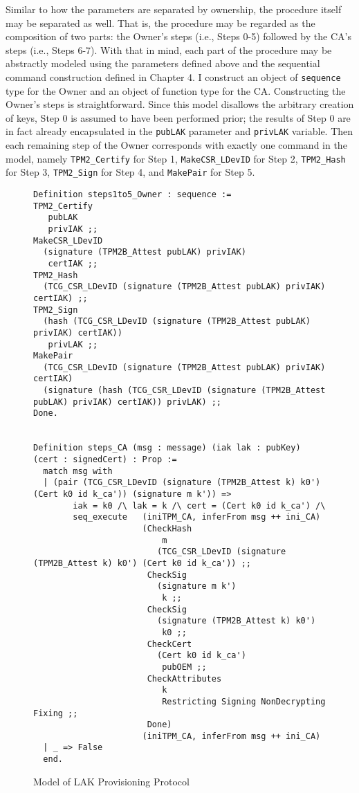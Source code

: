  Similar to how the parameters are separated by ownership, the procedure itself may be separated as well. That is, the procedure may be regarded as the composition of two parts: the Owner's steps (i.e., Steps 0-5) followed by the CA's steps (i.e., Steps 6-7).
 With that in mind, each part of the procedure may be abstractly modeled using the parameters defined above and the sequential command construction defined in Chapter 4. I construct an object of \verb|sequence| type for the Owner and an object of function type for the CA. Constructing the Owner's steps is straightforward. Since this model disallows the arbitrary creation of keys, Step 0 is assumed to have been performed prior; the results of Step 0 are in fact already encapsulated in the \verb|pubLAK| parameter and \verb|privLAK| variable. Then each remaining step of the Owner corresponds with exactly one command in the model, namely \verb|TPM2_Certify| for Step 1, \verb|MakeCSR_LDevID| for Step 2, \verb|TPM2_Hash| for Step 3, \verb|TPM2_Sign| for Step 4, and \verb|MakePair| for Step 5. 
\begin{figure}[h!]
\begin{lstlisting}[language=Coq]
Definition steps1to5_Owner : sequence :=
TPM2_Certify 
   pubLAK 
   privIAK ;;
MakeCSR_LDevID 
  (signature (TPM2B_Attest pubLAK) privIAK) 
   certIAK ;;
TPM2_Hash 
  (TCG_CSR_LDevID (signature (TPM2B_Attest pubLAK) privIAK) certIAK) ;;
TPM2_Sign 
  (hash (TCG_CSR_LDevID (signature (TPM2B_Attest pubLAK) privIAK) certIAK)) 
   privLAK ;;
MakePair 
  (TCG_CSR_LDevID (signature (TPM2B_Attest pubLAK) privIAK) certIAK) 
  (signature (hash (TCG_CSR_LDevID (signature (TPM2B_Attest pubLAK) privIAK) certIAK)) privLAK) ;;
Done. 


Definition steps_CA (msg : message) (iak lak : pubKey) (cert : signedCert) : Prop :=
  match msg with
  | (pair (TCG_CSR_LDevID (signature (TPM2B_Attest k) k0') (Cert k0 id k_ca')) (signature m k')) =>
        iak = k0 /\ lak = k /\ cert = (Cert k0 id k_ca') /\
        seq_execute   (iniTPM_CA, inferFrom msg ++ ini_CA)
                      (CheckHash 
                          m
                         (TCG_CSR_LDevID (signature (TPM2B_Attest k) k0') (Cert k0 id k_ca')) ;;
                       CheckSig
                         (signature m k') 
                          k ;;
                       CheckSig 
                         (signature (TPM2B_Attest k) k0') 
                          k0 ;;
                       CheckCert 
                         (Cert k0 id k_ca') 
                          pubOEM ;;
                       CheckAttributes 
                          k 
                          Restricting Signing NonDecrypting Fixing ;;
                       Done)
                      (iniTPM_CA, inferFrom msg ++ ini_CA)
  | _ => False
  end.
\end{lstlisting}
\caption{Model of LAK Provisioning Protocol}
\label{fig:lak_model}
\end{figure}

